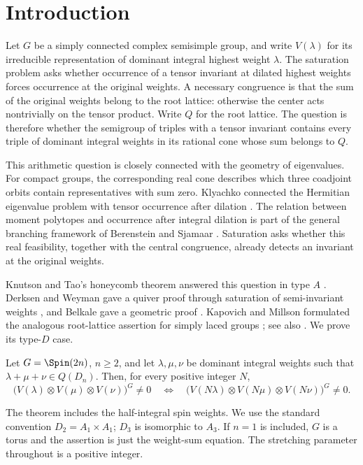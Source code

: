 \section{Introduction}\label{sec:introduction}

Let $G$ be a simply connected complex semisimple group, and write $V(\lambda)$
for its irreducible representation of dominant integral highest weight
$\lambda$. The saturation problem asks whether occurrence of a tensor
invariant at dilated highest weights forces occurrence at the original
weights. A necessary congruence is that the sum of the original weights
belong to the root lattice: otherwise the center acts nontrivially on the
tensor product. Write $Q$ for the root lattice. The question is therefore
whether the semigroup of triples with a tensor invariant contains every
triple of dominant integral weights in its rational cone whose sum
belongs to $Q$.

This arithmetic question is closely connected with the geometry of
eigenvalues. For compact groups, the corresponding real cone describes
which three coadjoint orbits contain representatives with sum zero.
Klyachko connected the Hermitian eigenvalue problem with tensor
occurrence after dilation \cite{Kly98}. The relation between moment
polytopes and occurrence after integral
dilation is part of the general branching framework of Berenstein and
Sjamaar \cite[Theorems~3.2.1--3.2.2]{BS00}. Saturation asks whether this
real feasibility, together with the central congruence, already detects
an invariant at the original weights.

Knutson and Tao's honeycomb theorem answered this question in type $A$
\cite{KT99}. Derksen and Weyman gave a quiver proof through saturation
of semi-invariant weights \cite{DW00}, and Belkale gave a geometric
proof \cite{Bel06}. Kapovich and Millson formulated the analogous root-lattice
assertion for simply laced groups
\cite[Conjecture~1.4(1)]{KM06}; see also
\cite[Conjecture~1.5]{KKM09}. We prove its type-$D$ case.

\begin{theorem}\label{thm:main}
Let $G=\Spin(2n)$, $n\ge2$, and let $\lambda,\mu,\nu$ be dominant
integral weights such that $\lambda+\mu+\nu\in Q(D_n)$. Then, for every
positive integer $N$,
\[
 \bigl(V(\lambda)\otimes V(\mu)\otimes V(\nu)\bigr)^G\ne0
 \quad\Longleftrightarrow\quad
 \bigl(V(N\lambda)\otimes V(N\mu)\otimes V(N\nu)\bigr)^G\ne0.
\]
\end{theorem}

The theorem includes the half-integral spin weights. We use the standard
convention $D_2=A_1\times A_1$; $D_3$ is isomorphic to $A_3$. If $n=1$
is included, $G$ is a torus and the assertion is just the weight-sum
equation. The stretching parameter throughout is a positive integer.


